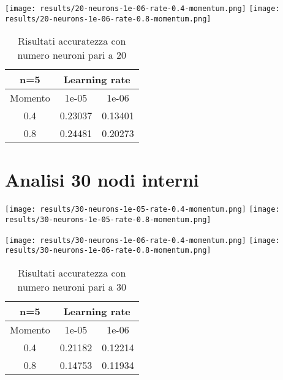 \begin{center}
\texttt{[image: results/20-neurons-1e-06-rate-0.4-momentum.png]}
\texttt{[image: results/20-neurons-1e-06-rate-0.8-momentum.png]}
\end{center}
\begin{table}[htbp]
    \centering
    \begin{tabular}{|c|c|c|}
    \hline
    n=5 & \multicolumn{2}{c|}{Learning rate} \\
    \hline
    Momento & 1e-05 & 1e-06 \\
    \hline
    0.4 & 0.23037 & 0.13401 \\
    \hline
    0.8 & 0.24481 & 0.20273 \\
    \hline
    \end{tabular}
    \caption{Risultati accuratezza con numero neuroni pari a 20}
\end{table}

\section{Analisi 30 nodi interni}
\begin{center}
\texttt{[image: results/30-neurons-1e-05-rate-0.4-momentum.png]}
\texttt{[image: results/30-neurons-1e-05-rate-0.8-momentum.png]}
\end{center}

\begin{center}
\texttt{[image: results/30-neurons-1e-06-rate-0.4-momentum.png]}
\texttt{[image: results/30-neurons-1e-06-rate-0.8-momentum.png]}
\label{fig:n5-m0.8-l1e-05}
\end{center}
\begin{table}[htbp]
    \centering
    \begin{tabular}{|c|c|c|}
    \hline
    n=5 & \multicolumn{2}{c|}{Learning rate} \\
    \hline
    Momento & 1e-05 & 1e-06 \\
    \hline
    0.4 & 0.21182 & 0.12214 \\
    \hline
    0.8 & 0.14753 & 0.11934 \\
    \hline
    \end{tabular}
    \caption{Risultati accuratezza con numero neuroni pari a 30}
\end{table}

